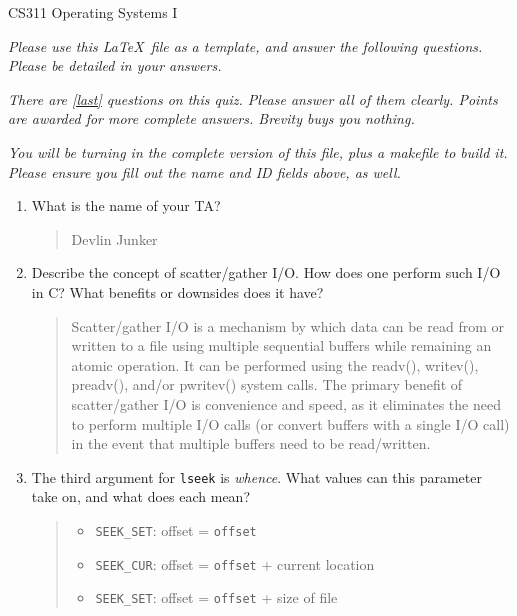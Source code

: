 \documentclass[letterpaper,10pt,onecolumn,titlepage]{article}
\begin{document}


{\Large CS311 Operating Systems I}

\emph{Please use this \LaTeX\ file as a template, and answer the following questions.
  Please be detailed in your answers.}

\emph{There are \ref{last} questions on this quiz. Please answer all of them clearly.
  Points are awarded for more complete answers. Brevity buys you nothing.}

\emph{You will be turning in the complete version of this file, plus a makefile to build
  it. Please ensure you fill out the name and ID fields above, as well.}

\begin{enumerate}%
\item What is the name of your TA?

\begin{quote}
Devlin Junker
\end{quote}

\item Describe the concept of scatter/gather I/O. How does one perform such I/O in C?
  What benefits or downsides does it have?

\begin{quote}
Scatter/gather I/O is a mechanism by which data can be read from or written to a file using multiple sequential buffers while remaining an atomic operation.  It can be performed using the readv(), writev(), preadv(), and/or pwritev() system calls.  The primary benefit of scatter/gather I/O is convenience and speed, as it eliminates the need to perform multiple I/O calls (or convert buffers with a single I/O call) in the event that multiple buffers need to be read/written.
\end{quote}

\item The third argument for \texttt{lseek} is \emph{whence}. What values can this
  parameter take on, and what does each mean?

\begin{quote}
\begin{itemize}
    \item \texttt{SEEK\_SET}: offset = \texttt{offset}
    \item \texttt{SEEK\_CUR}: offset = \texttt{offset} + current location
    \item \texttt{SEEK\_SET}: offset = \texttt{offset} + size of file
\end{itemize}
\end{quote}


\end{enumerate}
\end{document}
